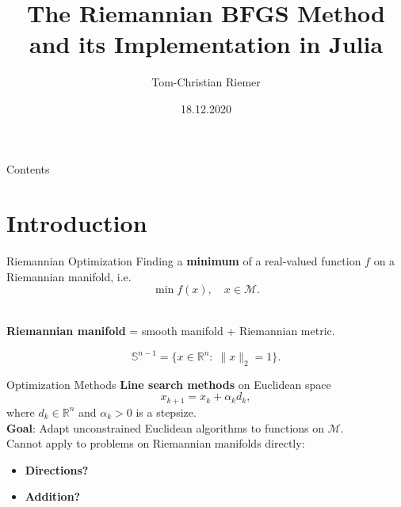 \documentclass[9.4pt]{beamer}
\title{The Riemannian BFGS Method and its Implementation in Julia}
\author{Tom-Christian Riemer}
\date{18.12.2020}
\institute[TUC]{TU Chemnitz, Research Seminar Scientific Computing}
\begin{document}
\tucthreeheadlines
\frame{\titlepage}

\begin{frame}{Contents}
    \tableofcontents
\end{frame}

\section{Introduction}

\begin{frame}{Riemannian Optimization}
    Finding a \textbf{minimum} of a real-valued function $f$ on a Riemannian manifold, i.e.
    \begin{equation*}
        \min f(x), \quad x \in \mathcal{M}.
    \end{equation*}\\[1.\baselineskip]
    \begin{center}
        \textbf{Riemannian manifold} = smooth manifold + Riemannian metric. \\[1.\baselineskip]
    \end{center}
    \begin{equation*}
        \mathbb{S}^{n-1} = \{ x \in \mathbb{R}^n \colon \; \lVert x \rVert_2 = 1 \}.
    \end{equation*}
\end{frame}

\begin{frame}{Optimization Methods}
    \textbf{Line search methods} on Euclidean space
    \begin{equation*}
        x_{k+1} = x_k + \alpha_k d_k,
    \end{equation*}
    where $d_k \in \mathbb{R}^n$ and $\alpha_k > 0$ is a stepsize. \\[1.\baselineskip]

    \textbf{Goal}: Adapt unconstrained Euclidean algorithms to functions on $\mathcal{M}$. \\[1.\baselineskip]

    Cannot apply to problems on Riemannian manifolds directly:
    \begin{itemize}
        \item \textbf{Directions?}
        \item \textbf{Addition?}
    \end{itemize}
\end{frame}
\end{document}
